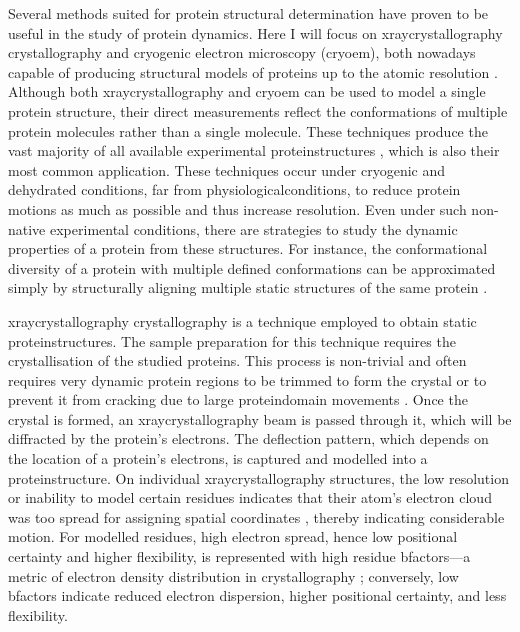 Several methods suited for protein structural determination have proven to be useful in the study of protein \gls{dynamics}. Here I will focus on \gls{xraycrystallography} crystallography and cryogenic electron \gls{microscopy} (\gls{cryoem}), both nowadays capable of producing structural models of proteins up to the atomic resolution \cite{yip_atomic-resolution_2020}. Although both \gls{xraycrystallography} and \gls{cryoem} can be used to model a single protein structure, their direct measurements reflect the conformations of multiple protein molecules rather than a single molecule. These techniques produce the vast majority of all available experimental \glspl{proteinstructure} \cite{noauthor_pdb_nodate_overal_statistics, noauthor_pdb_nodate_xray, noauthor_pdb_nodate_nmr, noauthor_pdb_nodate_cryoem}, which is also their most common application. These techniques occur under cryogenic and dehydrated conditions, far from \gls{physiologicalconditions}, to reduce protein motions as much as possible and thus increase resolution. Even under such non-native experimental conditions, there are strategies to study the dynamic properties of a protein from these structures. For instance, the conformational diversity of a protein with multiple defined \glspl{conformation} can be approximated simply by structurally aligning multiple static structures of the same protein \cite{monzon_codnas_2013, monzon_codnas_2016}. 


\gls{xraycrystallography} crystallography is a technique employed to obtain static \glspl{proteinstructure}. The sample preparation for this technique requires the crystallisation of the studied proteins. This process is non-trivial and often requires very dynamic protein regions to be trimmed to form the crystal or to prevent it from cracking due to large \gls{proteindomain} movements \cite{mooij_proteinccd_2009, gavrilov_nmr_2018}. Once the crystal is formed, an \gls{xraycrystallography} beam is passed through it, which will be diffracted by the protein's \glspl{electron}. The deflection pattern, which depends on the location of a protein's \glspl{electron}, is captured and modelled into a \gls{proteinstructure}. On individual \gls{xraycrystallography} structures, the low resolution or inability to model certain residues indicates that their atom's \gls{electron} cloud was too spread for assigning spatial coordinates \cite{smyth_x_2000}, thereby indicating considerable motion. For modelled residues, high \gls{electron} spread, hence low positional certainty and higher \gls{flexibility}, is represented with high residue \glspl{bfactor}---a metric of \gls{electron} density distribution in crystallography \cite{smyth_x_2000, carugo_b-factor_2022}; conversely, low \glspl{bfactor} indicate reduced \gls{electron} dispersion, higher positional certainty, and less \gls{flexibility}.


